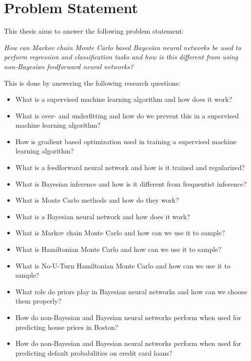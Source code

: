 \section{Problem Statement} \label{sec:problem}
This thesis aims to answer the following problem statement:
\begin{center}
    \textit{How can Markov chain Monte Carlo based Bayesian neural networks be used to perform regression and classification tasks and how is this different from using non-Bayesian feedforward neural networks?}
\end{center}
\noindent
This is done by answering the following research questions:
\begin{itemize}
    \item What is a supervised machine learning algorithm and how does it work?
    \item What is over- and underfitting and how do we prevent this in a supervised machine learning algorithm?
    \item How is gradient based optimization used in training a supervised machine learning algorithm?
    \item What is a feedforward neural network and how is it trained and regularized?
    \item What is Bayesian inference and how is it different from frequentist inference?
    \item What is Monte Carlo methods and how do they work?
    \item What is a Bayesian neural network and how does it work?
    \item What is Markov chain Monte Carlo and how can we use it to sample?
    \item What is Hamiltonian Monte Carlo and how can we use it to sample?
    \item What is No-U-Turn Hamiltonian Monte Carlo and how can we use it to sample?
    \item What role do priors play in Bayesian neural networks and how can we choose them properly? 
    \item How do non-Bayesian and Bayesian neural networks perform when used for predicting house prices in Boston?
    \item How do non-Bayesian and Bayesian neural networks perform when used for predicting default probabilities on credit card loans?
\end{itemize}

